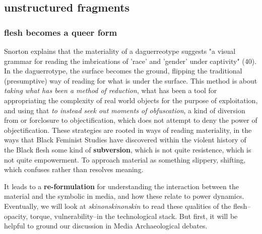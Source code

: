 \documentclass[11pt]{article}
\begin{document}
\subsection{unstructured fragments}
\label{sec:orgef0ddae}
\subsubsection{flesh becomes a queer form}
\label{sec:orge537167}
Snorton explains that the materiality of a daguerreotype suggests "a
visual grammar for reading the imbrications of 'race' and 'gender'
under captivity" (40). In the daguerrotype, the surface becomes the
ground, flipping the traditional (presumptive) way of reading for what
is under the surface. This method is about \emph{taking what has been a
method of reduction}, what has been a tool for appropriating the
complexity of real world objects for the purpose of exploitation, and
using that \emph{to instead seek out moments of obfuscation}, a kind of
diversion from or forclosure to objectification, which does not
attempt to deny the power of objectification. These strategies are
rooted in ways of reading materiality, in the ways that Black Feminist
Studies have discovered within the violent history of the Black flesh
some kind of \textbf{subversion}, which is not quite resistence, which is not
quite empowerment. To approach material as something slippery,
shifting, which confuses rather than resolves meaning.

It leads to a \textbf{re-formulation} for understanding the interaction
between the material and the symbolic in media, and how these relate
to power dynamics. Eventually, we will look at \emph{skinonskinonskin} to
read these qualities of the flesh--opacity, torque, vulnerability--in
the technological stack. But first, it will be helpful to ground our
discussion in Media Archaeological debates.
\end{document}
